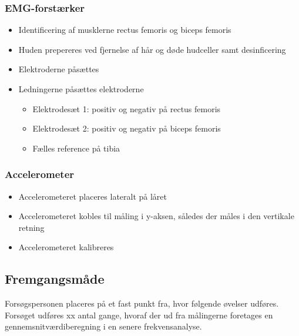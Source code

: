 \subsubsection{EMG-forstærker}
\begin{itemize}
\item Identificering af musklerne rectus femoris og biceps femoris 
\item Huden prepereres ved fjernelse af hår og døde hudceller samt desinficering 
\item Elektroderne påsættes
\item Ledningerne påsættes elektroderne
	\begin{itemize}
	\item Elektrodesæt 1: positiv og negativ på rectus femoris
	\item Elektrodesæt 2: positiv og negativ på biceps femoris
	\item Fælles reference på tibia
	\end{itemize} 
\end{itemize}

\subsubsection{Accelerometer}
\begin{itemize}
\item Accelerometeret placeres lateralt på låret
\item Accelerometeret kobles til måling i y-aksen, således der måles i den vertikale retning
\item Accelerometeret kalibreres
\end{itemize}

\subsection{Fremgangsmåde}
 Forsøgspersonen placeres på et fast punkt fra, hvor følgende øvelser udføres. Forsøget udføres xx antal gange, hvoraf der ud fra målingerne foretages en gennemsnitværdiberegning i en senere frekvensanalyse.

